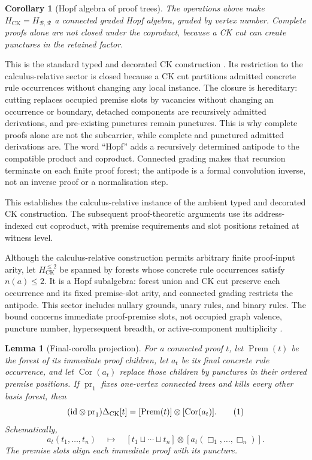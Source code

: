 \documentclass[10pt,a4paper]{article}
\theoremstyle{plain}
\newtheorem{lemma}[theorem]{Lemma}
\newtheorem{corollary}[theorem]{Corollary}
\theoremstyle{definition}
\theoremstyle{remark}
\newcommand{\Base}{\mathcal B}
\newcommand{\Rules}{\mathcal R}
\newcommand{\HCK}{H_{\mathrm{CK}}}
\newcommand{\Hlic}{H_{\Base,\Rules}}
\newcommand{\DeltaCK}{\Delta_{\mathrm{CK}}}
\newcommand{\fjoin}{\mathbin{\sqcup}}
\newcommand{\eqtag}{\refstepcounter{equation}\tag{\theequation}}
\begin{document}
\begin{corollary}[Hopf algebra of proof trees]
\label{cor:hopf}
The operations above make
\(\HCK=\Hlic\) a connected graded Hopf algebra, graded by vertex number.
Complete proofs alone are not closed under the coproduct, because a CK cut
can create punctures in the retained factor.
\end{corollary}

This is the standard typed and decorated CK construction
\cite{conneskreimer1998,foissy2002,foissy2021typed}.  Its restriction to
the calculus-relative sector is closed because a CK cut partitions
admitted concrete rule occurrences without changing any local instance.
The closure is hereditary: cutting replaces occupied premise slots by
vacancies without changing an occurrence or boundary, detached components
are recursively admitted derivations, and pre-existing punctures remain
punctures.  This is why complete proofs alone are not the subcarrier, while
complete and punctured admitted derivations are.
The word ``Hopf'' adds a recursively determined antipode to the compatible
product and coproduct.  Connected grading makes that recursion terminate on
each finite proof forest; the antipode is a formal convolution inverse, not
an inverse proof or a normalisation step.

This establishes the calculus-relative instance of the ambient typed and
decorated CK construction.  The subsequent
proof-theoretic arguments use its address-indexed cut coproduct, with
premise requirements and slot positions retained at witness level.

Although the calculus-relative construction permits arbitrary finite proof-input
arity, let \(\HCK^{\le2}\) be spanned by forests whose concrete rule
occurrences satisfy \(n(a)\le2\).  It is a Hopf subalgebra: forest union
and CK cut preserve each occurrence and its fixed premise-slot arity,
and connected grading restricts the antipode.  This sector includes
nullary grounds, unary rules, and binary rules.  The bound concerns
immediate proof-premise slots, not occupied graph valence, puncture number,
hypersequent breadth, or active-component multiplicity
\cite{conneskreimer1998,foissy2021typed}.

\begin{lemma}[Final-corolla projection]
\label{prop:final-rule-extraction}
For a connected proof \(t\), let \(\operatorname{Prem}(t)\) be the forest
of its immediate proof children, let \(a_t\) be its final concrete rule
occurrence, and let \(\operatorname{Cor}(a_t)\) replace those children by
punctures in their ordered premise positions.  If
\(\operatorname{pr}_1\) fixes one-vertex
connected trees and kills every other
basis forest, then
\[
 (\mathrm{id}\otimes\operatorname{pr}_1)\DeltaCK[t]
   =[\operatorname{Prem}(t)]\otimes[\operatorname{Cor}(a_t)] .
\eqtag\label{eq:final-rule-extraction}
\]
Schematically,
\[
 a_t(t_1,\ldots,t_n)
 \quad\longmapsto\quad
 [t_1\fjoin\cdots\fjoin t_n]\otimes
 [a_t(\Box_1,\ldots,\Box_n)] .
\]
The premise slots align each immediate proof with its puncture.
\end{lemma}
\end{document}
